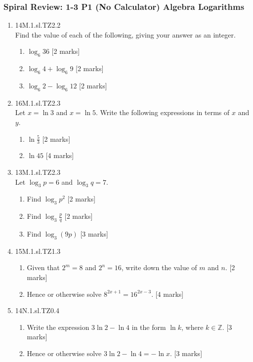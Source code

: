 \documentclass[12pt, twoside]{article}
\begin{document}
\subsubsection*{Spiral Review: 1-3 P1 (No Calculator) Algebra Logarithms}
 \begin{enumerate}

  \item 14M.1.sl.TZ2.2\\
  Find the value of each of the following, giving your answer as an integer.
  \begin{enumerate}
    \item $\log_6 36$ [2 marks]
    \item $\log_6 4 + \log_6 9$ [2 marks]
    \item $\log_6 2 - \log_6 12$ [2 marks]
  \end{enumerate}

  \item 16M.1.sl.TZ2.3\\
  Let $x=\ln 3$ and $x=\ln 5$. Write the following expressions in terms of $x$ and $y$.
  \begin{enumerate}
    \item $\ln \frac{5}{3}$ [2 marks]
    \item $\ln 45$ [4 marks]
  \end{enumerate}

  \item 13M.1.sl.TZ2.3\\
  Let $\log_3 p =6$ and $\log_3 q =7$.
  \begin{enumerate}
    \item Find $\log_3 p^2$ [2 marks]
    \item Find $\log_3 \frac{p}{q}$ [2 marks]
    \item Find $\log_3 (9p)$ [3 marks]
  \end{enumerate}

  \item 15M.1.sl.TZ1.3\\
  \begin{enumerate}
    \item Given that $2^m=8$ and $2^n=16$, write down the value of $m$ and $n$. [2 marks]
    \item Hence or otherwise solve $8^{2x+1} = 16^{2x-3}$. [4 marks]
  \end{enumerate}

  \item 14N.1.sl.TZ0.4\\
  \begin{enumerate}
    \item Write the expression $3 \ln 2- \ln 4$ in the form $\ln k$, where $k \in \mathbb{Z}$. [3 marks]
    \item Hence or otherwise solve $3 \ln 2- \ln 4 = - \ln x$. [3 marks]
  \end{enumerate}


\end{enumerate}
\end{document}
